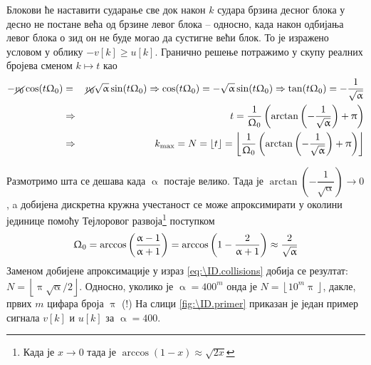 Блокови ће наставити сударање све док након $k$ судара брзина десног блока у десно не постане
већа од брзине левог блока -- односно, када након одбијања левог блока о зид он не буде могао да 
сустигне већи блок. То је изражено условом у облику $- v[k] \geq u[k]$.  Гранично решење потражимо
у скупу реалних бројева сменом $k \mapsto t$ као
\begin{eqnarray}
    - \cancel{v_0} \cos(t\Upomega_0) & = & \cancel{v_0} \sqrt{\upalpha} \sin(t\Upomega_0)
    \Rightarrow
    \cos(t\Upomega_0) = -\sqrt{\upalpha} \sin(t\Upomega_0) \Rightarrow 
    \tan(t\Upomega_0) = -\dfrac{1}{\sqrt{\upalpha}}
    \\
    & \Rightarrow & t = \dfrac{1}{\Upomega_0} 
    \left( \arctan\left(-\dfrac1{\sqrt{\upalpha}} \right) + \uppi \right)
    \\
    & \Rightarrow & k_\mr{max} = N = \lfloor t \rfloor = \left\lfloor \dfrac{1}{\Upomega_0} \left( \arctan\left(
        -\dfrac1{\sqrt{\upalpha}} \right) + \uppi \right) \right\rfloor
        \label{eq:\ID.collisions}
\end{eqnarray}

Размотримо шта се дешава када $\upalpha$ постаје велико. Тада је 
$\arctan \left(- \dfrac1{\sqrt{\upalpha}} \right) 
\to 0$, a добијена дискретна кружна учестаност се може апроксимирати у околини јединице
помоћу Тејлоровог развоја\footnote{Када је $x\to 0$ тада је $\arccos(1 - x) \approx \sqrt{2x}$} поступком
\begin{equation}
    \Upomega_0 = \arccos\left( \dfrac{\upalpha-1}{\upalpha+1} \right)
    = \arccos\left( 1 - \dfrac{2}{\upalpha+1} \right)
    \approx \dfrac{2}{\sqrt{ \upalpha }}
\end{equation}
Заменом добијене апроксимације у израз \ref{eq:\ID.collisions} добија се резултат:
$N = \left\lfloor \uppi \sqrt{\upalpha}/2 \right\rfloor$. \vspace{1mm} 
Односно, уколико је $\upalpha = 400^m$ онда је 
$N = \left\lfloor 10^m \uppi \right\rfloor$, дакле, првих $m$ цифара броја $\uppi$ (!)
На слици \ref{fig:\ID.primer} приказан је један пример сигнала $v[k]$ и $u[k]$ за 
$\upalpha = 400$. 
